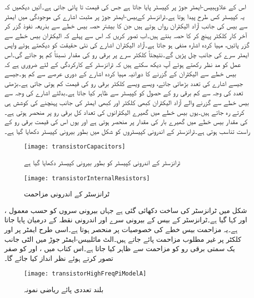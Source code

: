 اس کے علاوہبیس-ایمٹر    جوڑ پر  کپیسٹر  پایا جاتا ہے جس کی قیمت  تا  پائی جاتی ہے۔آئیں دیکھیں کہ یہ کپیسٹر کس طرح پیدا ہوتا ہے۔ٹرانزسٹر کےبیس-ایمٹر    جوڑ پر  مثبت اشارے  کی موجودگی میں ایمٹر    سے بیس  کی جانب آزاد الیکٹران رواں ہوتے ہیں جن کا بیشتر حصہ بیس  خطے سے بذریعہ نفوذ گزر کر آخر کار کلکٹر  پہنچ  کر  کا حصہ بنتے ہیں۔اب تصور کریں کہ اس سے پہلے کہ الیکٹران بیس  خطے سے گزر پائیں، مہیا کردہ اشارہ  منفی ہو جاتا ہے۔آزاد الیکٹران اشارے کی نئی حقیقت کو دیکھتے ہوئے واپس ایمٹر     سرے کی جانب چل پڑیں گے۔نتیجتاً کلکٹر  سرے پر برقی رو  کی مقدار نسبتاً کم ہو جائے گی۔اس عمل کو مد نظر رکھتے ہوئے آپ دیکھ سکتے ہیں کہ ٹرانزسٹر کے کارکردگی کے لئے ضروری ہے کہ بیس  خطے سے الیکٹران کے گزرنے کا دورانیہ مہیا کردہ اشارے  کے دوری عرصے سے کم ہو۔جیسے جیسے اشارے کی تعدد بڑھائی جائے، ویسے ویسے کلکٹر  برقی رو  کی قیمت کم ہوتی جاتی ہے۔بڑھتی تعدد کی وجہ سے کم برقی رو کے حصول کو کپیسٹر  سے ظاہر کیا جاتا ہے۔بدلتے اشارے کی وجہ سے بیس  خطے سے گزرنے والے آزاد الیکٹران کبھی کلکٹر  اور کبھی ایمٹر    کی جانب پہنچنے کی کوشش ہی کرتے رہ جاتے ہیں۔یوں بیس  خطے میں گھیرے الیکٹرانوں کی تعداد کل برقی رو  پر منحصر ہوتی ہے۔ کی مقدار بیس  خطے میں گھیرے بار کی مقدار پر منحصر ہوتی ہے اور یوں اس کی قیمت برقی رو کے راست تناسب ہوتی ہے۔ٹرانزسٹر کے اندرونی کپیسٹروں کو شکل  میں بطور بیرونی کپیسٹر دکھایا گیا ہے۔
\begin{figure}
\centering
\texttt{[image: transistorCapacitors]}
\caption{ٹرانزسٹر کے اندرونی کپیسٹر کو بطور بیرونی کپیسٹر دکھایا گیا ہے}
\label{شکل_تعددی_ردعمل_اندرونی_کپیسٹر}
\end{figure}
%
\begin{figure}
\centering
\texttt{[image: transistorInternalResistors]}
\caption{ٹرانزسٹر کے اندرونی مزاحمت}
\label{شکل_تعددی_ردعمل_اندرونی_مزاحمت}
\end{figure}

شکل  میں ٹرانزسٹر کی ساخت دکھائی گئی ہے جہاں بیرونی سروں کو حسب معمول ،  اور  کہا گیا ہے۔ٹرانزسٹر کے بیس  کے بیرونی سرے  اور اندرونی نقطہ  کے درمیان   پایا جاتا ہے۔یہ مزاحمت بیس  خطے کی خصوصیات پر منحصر ہوتا ہے۔اسی طرح ایمٹر    پر  اور کلکٹر  پر  غیر مطلوب مزاحمت پائے جاتے ہیں۔الٹ مائلبیس-ایمٹر    جوڑ میں الٹی جانب یک سمتی  برقی رو کو مزاحمت  سے ظاہر کیا جاتا ہے۔اس کتاب میں ، اور  کو صفر تصور کرتے ہوئے نظر انداز کیا جائے گا۔  
\begin{figure}
\centering
\texttt{[image: transistorHighFreqPiModelA]}
\caption{بلند تعددی پائے ریاضی نمونہ }
\label{شکل_تعددی_ردعمل_بلند_تعددی_ماڈل_الف}
\end{figure}

